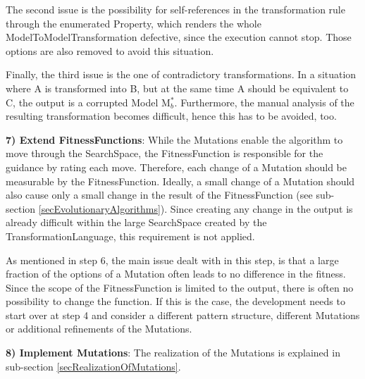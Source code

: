 The second issue is the possibility for self-references in the transformation rule through the enumerated \gls{Property}, which renders the whole \gls{ModelToModelTransformation} defective, since the execution cannot stop. Those options are also removed to avoid this situation.

Finally, the third issue is the one of contradictory transformations. In a situation where A is transformed into B, but at the same time A should be equivalent to C, the output is a corrupted \gls{Model} M$_b^*$. Furthermore, the manual analysis of the resulting transformation becomes difficult, hence this has to be avoided, too.

\textbf{7) Extend \glspl{FitnessFunction}}: While the \glspl{Mutation} enable the algorithm to move through the \gls{SearchSpace}, the \gls{FitnessFunction} is responsible for the guidance by rating each move. Therefore, each change of a \gls{Mutation} should be measurable by the \gls{FitnessFunction}. Ideally, a small change of a \gls{Mutation} should also cause only a small change in the result of the \gls{FitnessFunction} (see sub-section \ref{secEvolutionaryAlgorithms}). Since creating any change in the output is already difficult within the large \gls{SearchSpace} created by the \gls{TransformationLanguage}, this requirement is not applied.


As mentioned in step 6, the main issue dealt with in this step, is that a large fraction of the options of a \gls{Mutation} often leads to no difference in the fitness. Since the scope of the \gls{FitnessFunction} is limited to the output, there is often no possibility to change the function. If this is the case, the development needs to start over at step 4 and consider a different pattern structure, different \glspl{Mutation} or additional refinements of the \glspl{Mutation}.

\textbf{8) Implement \glspl{Mutation}}: The realization of the \glspl{Mutation} is explained in sub-section \ref{secRealizationOfMutations}.

